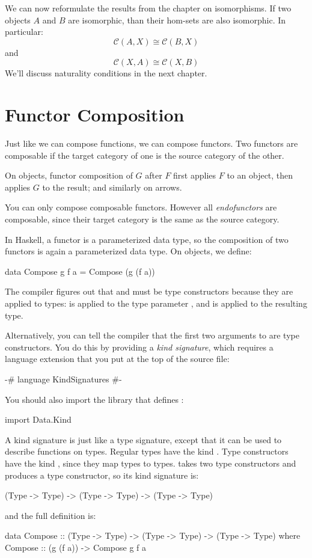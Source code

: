 \documentclass[DaoFP]{subfiles}
\begin{document}
We can now reformulate the results from the chapter on isomorphisms. If two objects $A$ and $B$ are isomorphic, than their hom-sets are also isomorphic. In particular:
\[\mathcal{C}(A, X) \cong \mathcal{C}(B, X)\]
and 
\[\mathcal{C}(X, A) \cong \mathcal{C}(X, B)\]
We'll discuss naturality conditions in the next chapter.


\section{Functor Composition}

Just like we can compose functions, we can compose functors. Two functors are composable if the target category of one is the source category of the other.

 On objects, functor composition of $G$ after $F$ first applies $F$ to an object, then applies $G$ to the result; and similarly on arrows.
 
 You can only compose composable functors. However all \emph{endofunctors} are composable, since their target category is the same as the source category.
 
 In Haskell, a functor is a parameterized data type, so the composition of two functors is again a parameterized data type. On objects, we define:
 \begin{haskell}
data Compose g f a = Compose (g (f a))
\end{haskell}
The compiler figures out that  and  must be type constructors because they are applied to types:  is applied to the type parameter , and  is applied to the resulting type.

Alternatively, you can tell the compiler that the first two arguments to  are type constructors. You do this by providing a \emph{kind signature}, which requires a language extension  that you put at the top of the source file:
\begin{haskell}
{-# language KindSignatures #-}
\end{haskell}
You should also import the  library that defines :
\begin{haskell}
import Data.Kind
\end{haskell}

A kind signature is just like a type signature, except that it can be used to describe functions on types. Regular types have the kind . Type constructors have the kind , since they map types to types.  takes two type constructors and produces a type constructor, so its kind signature is:
\begin{haskell}
(Type -> Type) -> (Type -> Type) -> (Type -> Type) 
\end{haskell}
and the full definition is:
\begin{haskell}
data Compose :: (Type -> Type) -> (Type -> Type) -> (Type -> Type) 
  where
    Compose :: (g (f a)) -> Compose g f a
\end{haskell}
\end{document}
